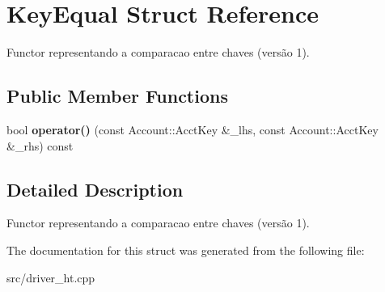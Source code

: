 \hypertarget{structKeyEqual}{}\section{Key\+Equal Struct Reference}
\label{structKeyEqual}


Functor representando a comparacao entre chaves (versão 1).  


\subsection*{Public Member Functions}
\begin{DoxyCompactItemize}
\item 
bool {\bfseries operator()} (const Account\+::\+Acct\+Key \&\+\_\+lhs, const Account\+::\+Acct\+Key \&\+\_\+rhs) const \hypertarget{structKeyEqual_ac1dcf5a10e2b40c36f005f0bd6bfa459}{}\label{structKeyEqual_ac1dcf5a10e2b40c36f005f0bd6bfa459}

\end{DoxyCompactItemize}


\subsection{Detailed Description}
Functor representando a comparacao entre chaves (versão 1). 

The documentation for this struct was generated from the following file\+:\begin{DoxyCompactItemize}
\item 
src/driver\+\_\+ht.\+cpp\end{DoxyCompactItemize}
